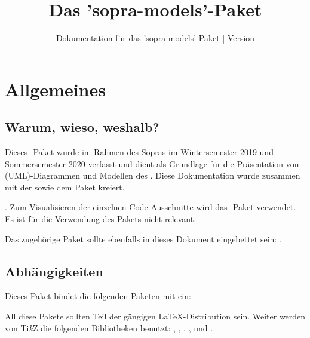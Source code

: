 \documentclass{sopra-base}
\title{Das 'sopra-models'-Paket}
\subtitle[Dokumentation für das 'sopra-models'-Paket]{Dokumentation für das 'sopra-models'-Paket | Version \thesomversion}
\begin{document}
    \maketitle

%
%

\section{Allgemeines}
\subsection{Warum, wieso, weshalb?}
    Dieses \LaTeXe-Paket wurde im Rahmen des Sopras im
    Wintersemester 2019 und Sommersemester 2020 verfasst und dient als
    Grundlage für die Präsentation von (UML)-Diagrammen und Modellen
    des . Diese Dokumentation wurde zusammen mit der
     sowie dem Paket  kreiert.\par
    .\newline
    Zum Visualisieren der einzelnen Code-Ausschnitte wird das
    -Paket verwendet. Es ist für die Verwendung des Pakets nicht relevant.\par
    Das zugehörige Paket sollte ebenfalls in dieses Dokument eingebettet sein: .
\subsection{Abhängigkeiten}
    Dieses Paket bindet die folgenden Paketen mit ein:
    \begin{multicols}{3}
    \end{multicols}
    All diese Pakete sollten Teil der gängigen \LaTeX-Distribution sein. Weiter werden von Ti\textit{k}Z die folgenden
    Bibliotheken benutzt: , , , ,  und .
\end{document}
